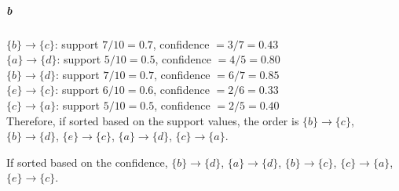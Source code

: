 \documentclass[22pt]{article}
\begin{document}
		\subparagraph{b} $\{b\} \rightarrow \{c\}$: support $7/10 = 0.7$, confidence $= 3/7 = 0.43$\\
		$\{a\} \rightarrow \{d\}$: support $5/10 = 0.5$, confidence $= 4/5 = 0.80$\\
		$\{b\} \rightarrow \{d\}$: support $7/10 = 0.7$, confidence $= 6/7 = 0.85$\\
		$\{e\} \rightarrow \{c\}$: support $6/10 = 0.6$, confidence $= 2/6 = 0.33$\\
		$\{c\} \rightarrow \{a\}$: support $5/10 = 0.5$, confidence $= 2/5 = 0.40$\\

		Therefore, if sorted based on the support values, the order is $\{b\} \rightarrow \{c\}$, $\{b\} \rightarrow \{d\}$, $\{e\} \rightarrow \{c\}$, $\{a\} \rightarrow \{d\}$, $\{c\} \rightarrow \{a\}$.

		If sorted based on the confidence, $\{b\} \rightarrow \{d\}$, $\{a\} \rightarrow \{d\}$, $\{b\} \rightarrow \{c\}$, $\{c\} \rightarrow \{a\}$,$\{e\} \rightarrow \{c\}$.
\end{document}
